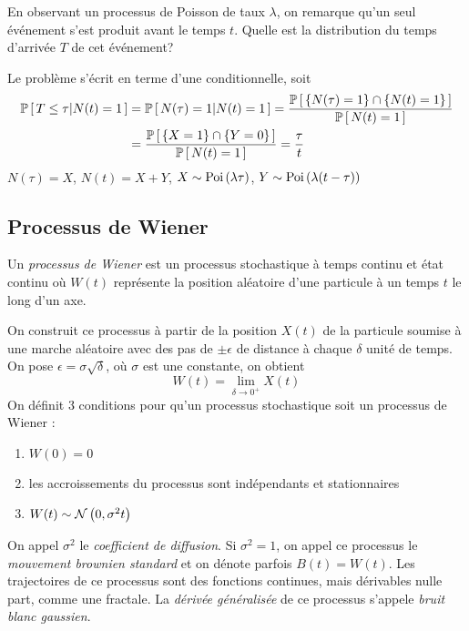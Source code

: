 \documentclass[11pt]{article}
\renewcommand\P[1]{%
	\ensuremath{%
		\mathbb{P}\left[\,#1\,\right]%
	}%
}%
\newcommand\Pg[2]{%
	\ensuremath{%
		\mathbb{P}\left[\,#1\middle\rvert#2\,\right]%
	}%
}%
\newcommand\Poi[1]{%
	\ensuremath{%
		\mathrm{Poi}\left(#1\right)%
	}%
}%
\newcommand\Norm[2]{%
	\ensuremath{%
		\mathcal{N}\left(#1,#2\right)%
	}%
}%
\begin{document}
\begin{exemple}
	En observant un processus de Poisson de taux $\lambda$, on remarque qu'un
	seul événement s'est produit avant le temps $t$. Quelle est la distribution
	du temps d'arrivée $T$ de cet événement?

	Le problème s'écrit en terme d'une conditionnelle, soit
	\begin{equation*}
		\begin{split}
		\Pg{T\leq\tau}{N(t)=1}
		&=\Pg{N(\tau)=1}{N(t)=1}
		=\frac{\P{\left\{N(\tau)=1\right\}\cap\left\{N(t)=1\right\}}}
			{\P{N(t)=1}}\\
		&=\frac{\P{\left\{X=1\right\}\cap\left\{Y=0\right\}}}
			{\P{N(t)=1}}
		=\frac{\tau}{t}
		\end{split}
	\end{equation*}
	$N(\tau)=X$, $N(t)=X+Y$, $X\sim\Poi{\lambda\tau}$, $Y\sim\Poi{\lambda(t-\tau)}$
\end{exemple}

\subsection{Processus de Wiener}
\begin{definition}
	Un \textit{processus de Wiener} est un processus stochastique à temps
	continu et état continu où $W(t)$ représente la position aléatoire d'une
	particule à un temps $t$ le long d'un axe.
\end{definition}

On construit ce processus à partir de la position $X(t)$ de la particule
soumise à une marche aléatoire avec des pas de $\pm\epsilon$ de distance à
chaque $\delta$ unité de temps. On pose $\epsilon=\sigma\sqrt{\delta}$, où 
$\sigma$ est une constante, on obtient
\begin{equation*}
	W(t)=\lim_{\delta\rightarrow 0^+}X(t)
\end{equation*}
On définit 3 conditions pour qu'un processus stochastique soit un processus
de Wiener :
\begin{enumerate}
	\item $W(0)=0$
	\item les accroissements du processus sont indépendants et stationnaires
	\item $W(t)\sim\Norm{0}{\sigma^2 t}$
\end{enumerate}

On appel $\sigma^2$ le \textit{coefficient de diffusion}. Si $\sigma^2=1$, on
appel ce processus le \textit{mouvement brownien standard} et on dénote parfois
$B(t)=W(t)$. Les trajectoires de ce processus sont des fonctions continues,
mais dérivables nulle part, comme une fractale. La \textit{dérivée généralisée}
de ce processus s'appele \textit{bruit blanc gaussien}.
\end{document}
